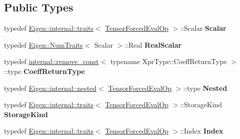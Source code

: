 \subsection*{Public Types}
\begin{DoxyCompactItemize}
\item 
\mbox{\label{class_eigen_1_1_tensor_forced_eval_op_ae8d2d94bec0a022ae7f4f1a9dfe626f4}} 
typedef \hyperlink{struct_eigen_1_1internal_1_1traits}{Eigen\+::internal\+::traits}$<$ \hyperlink{class_eigen_1_1_tensor_forced_eval_op}{Tensor\+Forced\+Eval\+Op} $>$\+::Scalar {\bfseries Scalar}
\item 
\mbox{\label{class_eigen_1_1_tensor_forced_eval_op_a350fe842a9813d17781293b963988136}} 
typedef \hyperlink{group___core___module_struct_eigen_1_1_num_traits}{Eigen\+::\+Num\+Traits}$<$ Scalar $>$\+::Real {\bfseries Real\+Scalar}
\item 
\mbox{\label{class_eigen_1_1_tensor_forced_eval_op_ab32b567d11d49e5710a7e657d6b7f591}} 
typedef \hyperlink{struct_eigen_1_1internal_1_1remove__const}{internal\+::remove\+\_\+const}$<$ typename Xpr\+Type\+::\+Coeff\+Return\+Type $>$\+::type {\bfseries Coeff\+Return\+Type}
\item 
\mbox{\label{class_eigen_1_1_tensor_forced_eval_op_a64370cdbb2a5d1be7da13ea60616a686}} 
typedef \hyperlink{struct_eigen_1_1internal_1_1nested}{Eigen\+::internal\+::nested}$<$ \hyperlink{class_eigen_1_1_tensor_forced_eval_op}{Tensor\+Forced\+Eval\+Op} $>$\+::type {\bfseries Nested}
\item 
\mbox{\label{class_eigen_1_1_tensor_forced_eval_op_a865527882c154e051cf69b98d1ae7339}} 
typedef \hyperlink{struct_eigen_1_1internal_1_1traits}{Eigen\+::internal\+::traits}$<$ \hyperlink{class_eigen_1_1_tensor_forced_eval_op}{Tensor\+Forced\+Eval\+Op} $>$\+::Storage\+Kind {\bfseries Storage\+Kind}
\item 
\mbox{\label{class_eigen_1_1_tensor_forced_eval_op_a0410ea106b6a36ca7304cd0e20daf9fa}} 
typedef \hyperlink{struct_eigen_1_1internal_1_1traits}{Eigen\+::internal\+::traits}$<$ \hyperlink{class_eigen_1_1_tensor_forced_eval_op}{Tensor\+Forced\+Eval\+Op} $>$\+::Index {\bfseries Index}

\end{DoxyCompactItemize}
